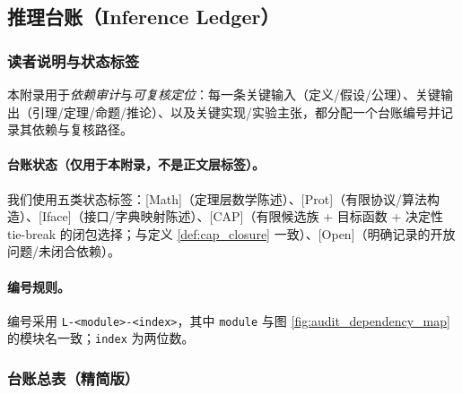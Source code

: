 \subsection{推理台账（Inference Ledger）}
\label{app:inference_ledger}

\subsubsection{读者说明与状态标签}

\AuditTag 本附录用于\emph{依赖审计}与\emph{可复核定位}：每一条关键输入（定义/假设/公理）、关键输出（引理/定理/命题/推论）、以及关键实现/实验主张，都分配一个台账编号并记录其依赖与复核路径。

\paragraph{台账状态（仅用于本附录，不是正文层标签）。}
我们使用五类状态标签：\textsf{[Math]}（定理层数学陈述）、\textsf{[Prot]}（有限协议/算法构造）、\textsf{[Iface]}（接口/字典映射陈述）、\textsf{[CAP]}（有限候选族 + 目标函数 + 决定性 tie-break 的闭包选择；与定义 \ref{def:cap_closure} 一致）、\textsf{[Open]}（明确记录的开放问题/未闭合依赖）。

\paragraph{编号规则。}
编号采用 \texttt{L-<module>-<index>}，其中 \texttt{module} 与图 \ref{fig:audit_dependency_map} 的模块名一致；\texttt{index} 为两位数。

\subsubsection{台账总表（精简版）}

